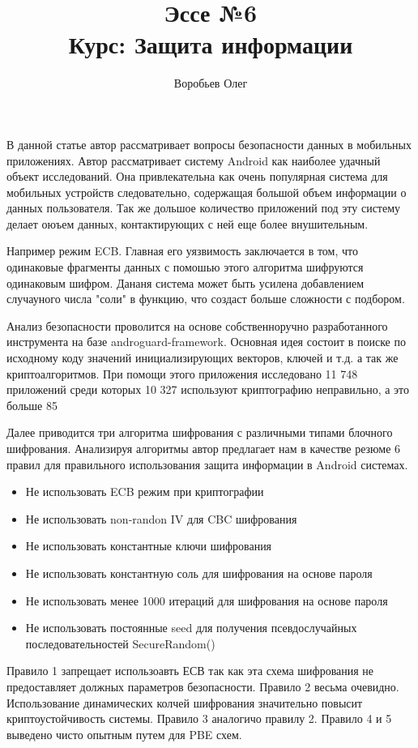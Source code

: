 \documentclass{article}
\title{Эссе №6 \\ Курс: Защита информации}
\author{Воробьев Олег}
\begin{document}
	\maketitle
	\clearpage

В данной статье автор рассматривает вопросы безопасности данных в мобильных приложениях. Автор рассматривает систему Android как наиболее удачный объект исследований. Она привлекательна как очень популярная система для мобильных устройств следовательно, содержащая большой объем информации о данных пользователя. Так же дольшое количество приложений под эту систему делает оюъем данных, контактирующих с ней еще более внушительным.

Например режим ECB. Главная его уязвимость заключается в том, что одинаковые фрагменты данных с помошью этого алгоритма шифруются одинаковым шифром. Дананя система может быть усилена добавлением случауного числа "соли" в функцию, что создаст больше сложности с подбором.

Анализ безопасности проволится на основе собственноручно разработанного инструмента на базе androguard-framework. Основная идея состоит в поиске по исходному коду значений инициализирующих векторов, ключей и т.д. а так же криптоалгоритмов. При помощи этого приложения исследовано 11 748 приложений среди которых 10 327 используют криптографию неправильно, а это больше 85%


Далее приводится три алгоритма шифрования с различными типами блочного шифрования. Анализируя алгоритмы автор предлагает нам в качестве резюме 6 правил для правильного использования защита информации в Android системах.

\begin{itemize}
\item Не использовать ECB режим при криптографии
\item Не использовать non-randon IV для CBC шифрования
\item Не использовать константные ключи шифрования
\item Не использовать константную соль для шифрования на основе пароля
\item Не использовать менее 1000 итераций для шифрования на основе пароля
\item Не использовать постоянные seed для получения псевдослучайных последовательностей SecureRandom()
\end{itemize}

Правило 1 запрещает использоавть ЕСВ так как эта схема шифрования не предоставляет должных параметров безопасности.
Правило 2 весьма очевидно. Использование динамических колчей шифрования значительно повысит криптоустойчивость системы.
Правило 3 аналогичо правилу 2.
Правило 4 и 5 выведено чисто опытным путем для PBE схем.
\end{document}
